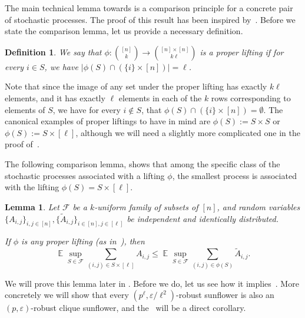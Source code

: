\documentclass[10pt,a4paper]{article}
\DeclareMathOperator{\E}{\mathbb{E}}
\newtheorem{definition}[theorem]{Definition}
\newtheorem{lemma}[theorem]{Lemma}
\newcommand{\jnote}[1]{\todo[inline,backgroundcolor=blue!20!green]{#1 \\ \textsc{--Jarek}}}
\begin{document}
\thmrcbcomparison*

The main technical lemma towards  is a comparison principle for a concrete pair of stochastic processes.  The proof of this result has been inspired by~\cite{talagrand93}. Before we state the comparison lemma, let us provide a necessary definition.
\begin{definition} 
\label{def:proper-lifting}
We say that $\phi : \binom{[n]}{k} \to \binom{[n] \times [n]}{k\ell}$ is a \emph{proper lifting} if for every $i \in S$, we have $|\phi(S) \cap (\{i\} \times [n])| = \ell$. 
\end{definition}
Note that since the image of any set under the proper lifting has exactly $k \ell$ elements, and it has exactly $\ell$ elements in each of the $k$ rows corresponding to elements of $S$, we have for every $i\not\in S$, that $\phi(S) \cap (\{i \} \times [n]) = \emptyset$. The canonical examples of proper liftings to have in mind are $\phi(S) := S\times S$ or $\phi(S) := S\times [\ell]$, although we will need a slightly more complicated one in the proof of~.

The following comparison lemma, shows that among the specific class of the stochastic processes associated with a lifting $\phi$, the smallest process is associated with the lifting $\phi(S) = S\times [\ell]$.
\begin{lemma}
\label{lem:comparison-lemma}
    Let $\mathcal{F}$ be a $k$-uniform family of subsets of $[n]$, and random variables $\{A_{i,j}\}_{i,j \in [n]}, \{\tilde{A}_{i,j}\}_{i\in [n], j \in [\ell]}$ be independent and identically distributed.

    If $\phi$ is any proper lifting (as in~), then
    \begin{equation}
    \label{eq:comparison-lemma}
        \E \sup_{S \in \mathcal{F}} \sum_{(i, j) \in S \times [\ell]} A_{i,j} \leq \E \sup_{S \in \mathcal{F}} \sum_{(i,j) \in \phi(S)} \tilde{A}_{i,j}.
    \end{equation}
\end{lemma}
We will prove this lemma later in . Before we do, let us see how it implies~. More concretely we will show that every $(p^\ell, \varepsilon/\ell^2)$-robust sunflower is also an $(p, \varepsilon)$-robust clique sunflower, and the~ will be a direct corollary.
\end{document}
